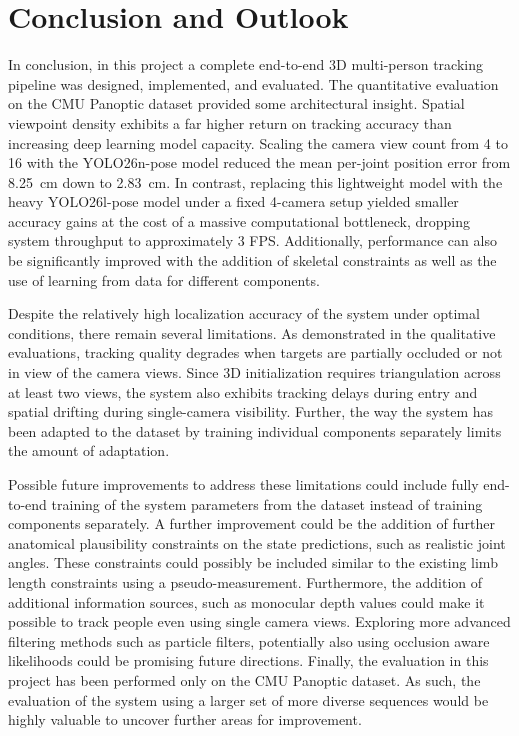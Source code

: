 
\section{Conclusion and Outlook} \label{conclusion}

In conclusion, in this project a complete end-to-end 3D multi-person tracking pipeline was designed, implemented, and evaluated.
The quantitative evaluation on the CMU Panoptic dataset provided some architectural insight. Spatial viewpoint density exhibits a far higher return on tracking accuracy than increasing deep learning model capacity. Scaling the camera view count from 4 to 16 with the YOLO26n-pose model reduced the mean per-joint position error from 8.25 cm down to 2.83 cm. In contrast, replacing this lightweight model with the heavy YOLO26l-pose model under a fixed 4-camera setup yielded smaller accuracy gains at the cost of a massive computational bottleneck, dropping system throughput to approximately 3 FPS.
Additionally, performance can also be significantly improved with the addition of skeletal constraints as well as the use of learning from data for different components.  

Despite the relatively high localization accuracy of the system under optimal conditions, there remain several limitations. As demonstrated in the qualitative evaluations, tracking quality degrades when targets are partially occluded or not in view of the camera views. Since 3D initialization requires triangulation across at least two views, the system also exhibits tracking delays during entry and spatial drifting during single-camera visibility. Further, the way the system has been adapted to the dataset by training individual components separately limits the amount of adaptation.

Possible future improvements to address these limitations could include fully end-to-end training of the system parameters from the dataset instead of training components separately. A further improvement could be the addition of further anatomical plausibility constraints on the state predictions, such as realistic joint angles. These constraints could possibly be included similar to the existing limb length constraints using a pseudo-measurement. Furthermore, the addition of additional information sources, such as monocular depth values could make it possible to track people even using single camera views. Exploring more advanced filtering methods such as particle filters, potentially also using occlusion aware likelihoods could be promising future directions. Finally, the evaluation in this project has been performed only on the CMU Panoptic dataset. As such, the evaluation of the system using a larger set of more diverse sequences would be highly valuable to uncover further areas for improvement.
